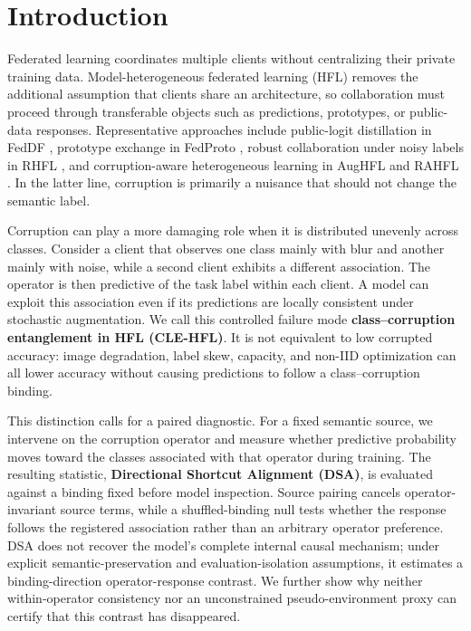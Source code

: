 \section{Introduction}

Federated learning coordinates multiple clients without centralizing their private training data. Model-heterogeneous federated learning (HFL) removes the additional assumption that clients share an architecture, so collaboration must proceed through transferable objects such as predictions, prototypes, or public-data responses. Representative approaches include public-logit distillation in FedDF \citep{lin2020feddf}, prototype exchange in FedProto \citep{tan2022fedproto}, robust collaboration under noisy labels in RHFL \citep{fang2022rhfl}, and corruption-aware heterogeneous learning in AugHFL and RAHFL \citep{fang2023aughfl,fang2025rahfl}. In the latter line, corruption is primarily a nuisance that should not change the semantic label.

Corruption can play a more damaging role when it is distributed unevenly across classes. Consider a client that observes one class mainly with blur and another mainly with noise, while a second client exhibits a different association. The operator is then predictive of the task label within each client. A model can exploit this association even if its predictions are locally consistent under stochastic augmentation. We call this controlled failure mode \textbf{class--corruption entanglement in HFL (CLE-HFL)}. It is not equivalent to low corrupted accuracy: image degradation, label skew, capacity, and non-IID optimization can all lower accuracy without causing predictions to follow a class--corruption binding.

This distinction calls for a paired diagnostic. For a fixed semantic source, we intervene on the corruption operator and measure whether predictive probability moves toward the classes associated with that operator during training. The resulting statistic, \textbf{Directional Shortcut Alignment (DSA)}, is evaluated against a binding fixed before model inspection. Source pairing cancels operator-invariant source terms, while a shuffled-binding null tests whether the response follows the registered association rather than an arbitrary operator preference. DSA does not recover the model's complete internal causal mechanism; under explicit semantic-preservation and evaluation-isolation assumptions, it estimates a binding-direction operator-response contrast. We further show why neither within-operator consistency nor an unconstrained pseudo-environment proxy can certify that this contrast has disappeared.

